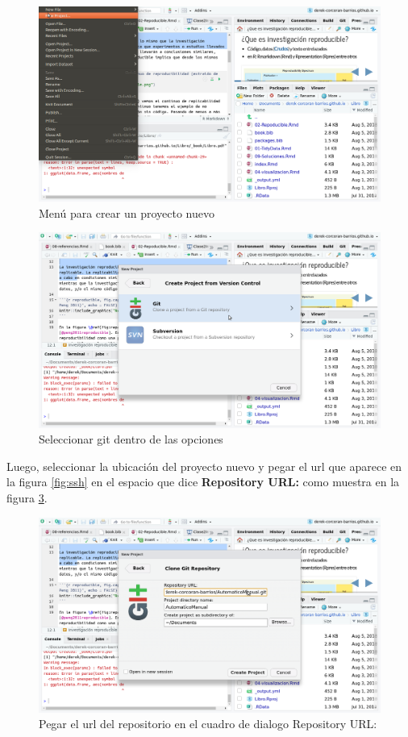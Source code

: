 \documentclass[]{book}
\begin{document}
\begin{figure}

{\centering \includegraphics[width=0.8\linewidth]{NewProject} 

}

\caption{Menú para crear un proyecto nuevo}\label{fig:NewProject}
\end{figure}

\begin{figure}

{\centering \includegraphics[width=0.8\linewidth]{Git} 

}

\caption{Seleccionar git dentro de las opciones}\label{fig:Git}
\end{figure}

Luego, seleccionar la ubicación del proyecto nuevo y pegar el url que
aparece en la figura \ref{fig:ssh} en el espacio que dice
\textbf{Repository URL:} como muestra en la figura \ref{fig:GitRstudio}.

\begin{figure}

{\centering \includegraphics[width=0.8\linewidth]{GitRstudio} 

}

\caption{Pegar el url del repositorio en el cuadro de dialogo Repository URL:}\label{fig:GitRstudio}
\end{figure}
\end{document}
